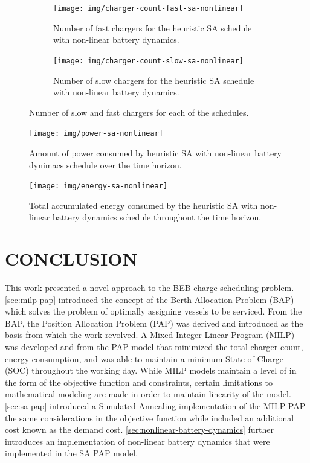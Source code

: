\documentclass[ee,thesis]{usuthesis}
\begin{document}
\begin{figure}
  \centering
  \begin{subfigure}[t]{\textwidth}
    \centering
    \texttt{[image: img/charger-count-fast-sa-nonlinear]}
    \caption{Number of fast chargers for the heuristic SA schedule with non-linear battery dynamics.}
    \label{subfig:fast-charger-usage-nonlinear-sa}
  \end{subfigure}

  \begin{subfigure}[t]{\textwidth}
    \centering
    \texttt{[image: img/charger-count-slow-sa-nonlinear]}
    \caption{Number of slow chargers for the heuristic SA schedule with non-linear battery dynamics.}
    \label{subfig:slow-charger-usage-nonlinear-sa}
  \end{subfigure}
        \caption{Number of slow and fast chargers for each of the schedules.}
        \label{fig:charger-usage-nonlinear-sa}
\end{figure}

\begin{figure}[h]
  \centering
  \texttt{[image: img/power-sa-nonlinear]}
  \caption{Amount of power consumed by heuristic SA with non-linear battery dynimacs schedule over the time horizon.}
  \label{fig:power-usage-nonlinear-sa}
\end{figure}

\begin{figure}[htpb]
\centering \texttt{[image: img/energy-sa-nonlinear]}
    \caption{Total accumulated energy consumed by the heuristic SA with non-linear battery dynamics schedule throughout the time horizon.}
    \label{fig:energy-usage-nonlinear-sa}
\end{figure}

\chapter{CONCLUSION}
\label{sec:conclusion}
This work presented a novel approach to the BEB charge scheduling problem. \ref{sec:milp-pap} introduced the concept of the
Berth Allocation Problem (BAP) which solves the problem of optimally assigning vessels to be serviced. From the BAP, the
Position Allocation Problem (PAP) was derived and introduced as the basis from which the work revolved. A Mixed Integer
Linear Program (MILP) was developed and from the PAP model that minimized the total charger count, energy consumption,
and was able to maintain a minimum State of Charge (SOC) throughout the working day. While MILP models maintain a level
of in the form of the objective function and constraints, certain limitations to mathematical modeling are made in order
to maintain linearity of the model. \ref{sec:sa-pap} introduced a Simulated Annealing implementation of the MILP PAP the same
considerations in the objective function while included an additional cost known as the demand cost.
\ref{sec:nonlinear-battery-dynamics} further introduces an implementation of non-linear battery dynamics that were
implemented in the SA PAP model.
\end{document}
